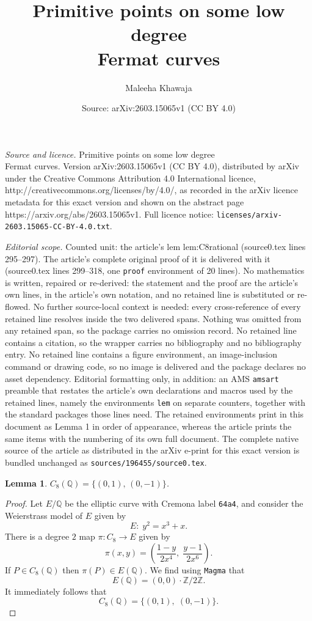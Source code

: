 \documentclass[10pt,a4paper]{amsart}
\title{Primitive points on some low degree\\ Fermat curves}
\author{Maleeha Khawaja}
\date{Source: arXiv:2603.15065v1 (CC BY 4.0)}
\newtheorem{lem}{Lemma}
\newcommand{\Q}{\mathbb{Q}}
\newcommand{\Z}{\mathbb{Z}}
\begin{document}
\maketitle

\noindent\emph{Source and licence.} Primitive points on some low degree\\ Fermat curves. Version arXiv:2603.15065v1 (CC BY 4.0), distributed by arXiv under the Creative Commons Attribution 4.0 International licence, http://creativecommons.org/licenses/by/4.0/, as recorded in the arXiv licence metadata for this exact version and shown on the abstract page https://arxiv.org/abs/2603.15065v1. Full licence notice: \texttt{licenses/arxiv-2603.15065-CC-BY-4.0.txt}.\par\smallskip

\noindent\textit{Editorial scope.} Counted unit: the article's lem lem:C8rational (source0.tex lines 295--297). The article's complete original proof of it is delivered with it (source0.tex lines 299--318, one \texttt{proof} environment of 20 lines). No mathematics is written, repaired or re-derived: the statement and the proof are the article's own lines, in the article's own notation, and no retained line is substituted or re-flowed.  No further source-local context is needed: every cross-reference of every retained line resolves inside the two delivered spans.  Nothing was omitted from any retained span, so the package carries no omission record.  No retained line contains a citation, so the wrapper carries no bibliography and no bibliography entry.  No retained line contains a figure environment, an image-inclusion command or drawing code, so no image is delivered and the package declares no asset dependency.  Editorial formatting only, in addition: an AMS \texttt{amsart} preamble that restates the article's own declarations and macros used by the retained lines, namely the environments \texttt{lem} on separate counters, together with the standard packages those lines need.  The retained environments print in this document as Lemma 1 in order of appearance, whereas the article prints the same items with the numbering of its own full document.  The complete native source of the article as distributed in the arXiv e-print for this exact version is bundled unchanged as \texttt{sources/196455/source0.tex}.
\begin{lem}\label{lem:C8rational}
    $C_8(\Q) = \{(0,1),\, (0,-1)\}$.
\end{lem}

\begin{proof}
Let $E/\Q$ be the elliptic curve with Cremona label \texttt{64a4}, and consider the Weierstrass model of $E$ given by 
\[
E:\; y^2 = x^3 + x.
\]
There is a degree $2$ map $\pi: C_8\rightarrow  E$
given by 
\[
\pi(x,y) = \left(\dfrac{1-y}{2x^4},\;\dfrac{y-1}{2x^6}\right).
\]
If $P\in C_8(\Q)$ then $\pi(P)\in E(\Q)$.
We find using \texttt{Magma} that
\[
E(\Q) = (0,0)\cdot \Z/2\Z.
\]
It immediately follows that 
\[
C_8(\Q)=\{(0,1),\; (0,-1)\}.
\]
\end{proof}
\end{document}
